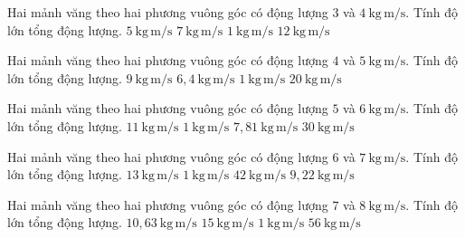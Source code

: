 \begin{ex}
Hai mảnh văng theo hai phương vuông góc có động lượng $3$ và $4\ \mathrm{kg\,m/s}$. Tính độ lớn tổng động lượng.
\choice
{\True $5\ \mathrm{kg\,m/s}$}
{$7\ \mathrm{kg\,m/s}$}
{$1\ \mathrm{kg\,m/s}$}
{$12\ \mathrm{kg\,m/s}$}
\end{ex}

\begin{ex}
Hai mảnh văng theo hai phương vuông góc có động lượng $4$ và $5\ \mathrm{kg\,m/s}$. Tính độ lớn tổng động lượng.
\choice
{$9\ \mathrm{kg\,m/s}$}
{\True $6,4\ \mathrm{kg\,m/s}$}
{$1\ \mathrm{kg\,m/s}$}
{$20\ \mathrm{kg\,m/s}$}
\end{ex}

\begin{ex}
Hai mảnh văng theo hai phương vuông góc có động lượng $5$ và $6\ \mathrm{kg\,m/s}$. Tính độ lớn tổng động lượng.
\choice
{$11\ \mathrm{kg\,m/s}$}
{$1\ \mathrm{kg\,m/s}$}
{\True $7,81\ \mathrm{kg\,m/s}$}
{$30\ \mathrm{kg\,m/s}$}
\end{ex}

\begin{ex}
Hai mảnh văng theo hai phương vuông góc có động lượng $6$ và $7\ \mathrm{kg\,m/s}$. Tính độ lớn tổng động lượng.
\choice
{$13\ \mathrm{kg\,m/s}$}
{$1\ \mathrm{kg\,m/s}$}
{$42\ \mathrm{kg\,m/s}$}
{\True $9,22\ \mathrm{kg\,m/s}$}
\end{ex}

\begin{ex}
Hai mảnh văng theo hai phương vuông góc có động lượng $7$ và $8\ \mathrm{kg\,m/s}$. Tính độ lớn tổng động lượng.
\choice
{\True $10,63\ \mathrm{kg\,m/s}$}
{$15\ \mathrm{kg\,m/s}$}
{$1\ \mathrm{kg\,m/s}$}
{$56\ \mathrm{kg\,m/s}$}
\end{ex}

